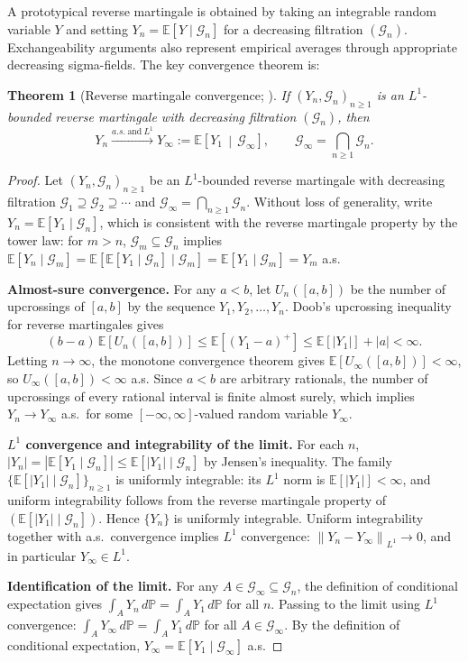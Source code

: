 \documentclass[bj,authoryear]{imsart}
\theoremstyle{plain}
\newtheorem{theorem}{Theorem}[section]
\theoremstyle{definition}
\newcommand{\E}{\mathbb{E}}
\newcommand{\Prob}{\mathbb{P}}
\newcommand{\G}{\mathcal{G}}
\newcommand{\norm}[1]{\left\lVert #1 \right\rVert}
\newcommand{\given}{\mid}
\begin{document}
A prototypical reverse martingale is obtained by taking an integrable random
variable $Y$ and setting $Y_n=\E[Y\mid\G_n]$ for a decreasing filtration
$(\G_n)$.  Exchangeability arguments also represent empirical averages through
appropriate decreasing sigma-fields.  The key convergence theorem is:

\begin{theorem}[Reverse martingale convergence; \citealt{doob1953stochastic}]
\label{thm:revmg}
  If $(Y_n, \G_n)_{n\geq 1}$ is an $L^1$-bounded reverse martingale with
  decreasing filtration $(\G_n)$, then
  \[
    Y_n \xrightarrow{a.s.\ \text{and}\ L^1}
    Y_\infty := \E\!\left[Y_1 \,\middle|\, \G_\infty\right],
    \qquad \G_\infty = \bigcap_{n \geq 1} \G_n.
  \]
\end{theorem}

\begin{proof}
  Let $(Y_n, \G_n)_{n\geq 1}$ be an $L^1$-bounded reverse martingale
  with decreasing filtration $\G_1 \supseteq \G_2 \supseteq \cdots$
  and $\G_\infty = \bigcap_{n\geq 1}\G_n$.
  Without loss of generality, write $Y_n = \E[Y_1\given\G_n]$, which is
  consistent with the reverse martingale property by the tower law:
  for $m > n$, $\G_m \subseteq \G_n$ implies
  $\E[Y_n\given\G_m] = \E[\E[Y_1\given\G_n]\given\G_m]
   = \E[Y_1\given\G_m] = Y_m$ a.s.

  \textbf{Almost-sure convergence.}
  For any $a < b$, let $U_n([a,b])$ be the number of upcrossings of
  $[a,b]$ by the sequence $Y_1, Y_2, \ldots, Y_n$.
  Doob's upcrossing inequality for reverse martingales
  \citep[Chapter~V]{neveu1975discrete} gives
  \[
    (b-a)\,\E[U_n([a,b])] \leq \E[(Y_1 - a)^+] \leq \E[|Y_1|] + |a| < \infty.
  \]
  Letting $n\to\infty$, the monotone convergence theorem gives
  $\E[U_\infty([a,b])] < \infty$, so $U_\infty([a,b]) < \infty$ a.s.
  Since $a < b$ are arbitrary rationals, the number of upcrossings of
  every rational interval is finite almost surely, which implies
  $Y_n \to Y_\infty$ a.s.\ for some $[-\infty,\infty]$-valued random
  variable $Y_\infty$.

  \textbf{$L^1$ convergence and integrability of the limit.}
  For each $n$, $|Y_n| = |\E[Y_1\given\G_n]| \leq \E[|Y_1|\given\G_n]$
  by Jensen's inequality.  The family $\{\E[|Y_1|\given\G_n]\}_{n\geq 1}$
  is uniformly integrable: its $L^1$ norm is $\E[|Y_1|] < \infty$, and
  uniform integrability follows from the reverse martingale property
  of $(\E[|Y_1|\given\G_n])$.  Hence $\{Y_n\}$ is uniformly integrable.
  Uniform integrability together with a.s.\ convergence implies $L^1$
  convergence: $\norm{Y_n - Y_\infty}_{L^1} \to 0$, and in particular
  $Y_\infty \in L^1$.

  \textbf{Identification of the limit.}
  For any $A \in \G_\infty \subseteq \G_n$, the definition of conditional
  expectation gives $\int_A Y_n\,d\Prob = \int_A Y_1\,d\Prob$ for all
  $n$.  Passing to the limit using $L^1$ convergence:
  $\int_A Y_\infty\,d\Prob = \int_A Y_1\,d\Prob$ for all $A\in\G_\infty$.
  By the definition of conditional expectation,
  $Y_\infty = \E[Y_1\given\G_\infty]$ a.s.
\end{proof}
\end{document}
